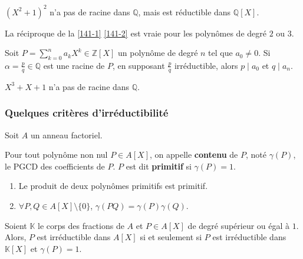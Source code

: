   \begin{cexample}
    $(X^2+1)^2$ n'a pas de racine dans $\mathbb{Q}$, mais est réductible dans $\mathbb{Q}[X]$.
  \end{cexample}

  \begin{proposition}
    La réciproque de la \cref{141-1} \cref{141-2} est vraie pour les polynômes de degré $2$ ou $3$.
  \end{proposition}

  \begin{proposition}
    Soit $P = \sum_{k=0}^n a_k X^k \in \mathbb{Z}[X]$ un polynôme de degré $n$ tel que $a_0 \neq 0$. Si $\alpha = \frac{p}{q} \in \mathbb{Q}$ est une racine de $P$, en supposant $\frac{p}{q}$ irréductible, alors $p \mid a_0$ et $q \mid a_n$.
  \end{proposition}


  \begin{example}
    $X^3 + X + 1$ n'a pas de racine dans $\mathbb{Q}$.
  \end{example}

  \subsubsection{Quelques critères d'irréductibilité}

  Soit $A$ un anneau factoriel.


  \begin{definition}
    Pour tout polynôme non nul $P \in A[X]$, on appelle \textbf{contenu} de $P$, noté $\gamma(P)$, le PGCD des coefficients de $P$. $P$ est dit \textbf{primitif} si $\gamma(P) = 1$.
  \end{definition}

  \begin{lemma}[Gauss]
    \begin{enumerate}[label=(\roman*)]
      \item Le produit de deux polynômes primitifs est primitif.
      \item $\forall P, Q \in A[X] \setminus \{ 0 \}$, $\gamma(PQ) = \gamma(P) \gamma(Q)$.
    \end{enumerate}
  \end{lemma}

  \begin{theorem}
    Soient $\mathbb{K}$ le corps des fractions de $A$ et $P \in A[X]$ de degré supérieur ou égal à $1$. Alors, $P$ est irréductible dans $A[X]$ si et seulement si $P$ est irréductible dans $\mathbb{K}[X]$ et $\gamma(P)=1$.
  \end{theorem}

